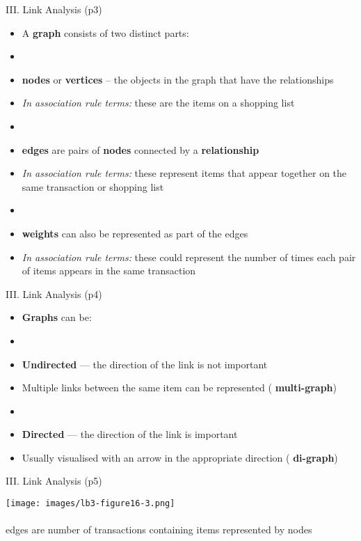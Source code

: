 \documentclass[handout]{beamer}
\newcommand{\strong}[1]{\textbf{\color{teal} #1}}
\newcommand{\stronger}[1]{\textbf{\color{purple} #1}}
\begin{document}
\begin{frame}{III. Link Analysis (p3)}
\begin{itemize}
\item[] A \stronger{graph} consists of two distinct parts:
\item[]
\item \strong{nodes} or \strong{vertices} -- the objects in the graph that have the relationships
\item \emph{In association rule terms:} these are the items on a shopping list
\item[]
\item \strong{edges} are pairs of \strong{nodes} connected by a \strong{relationship}
\item \emph{In association rule terms:} these represent items that appear together on the same transaction or shopping list
\item[]
\item \stronger{weights} can also be represented as part of the edges
\item \emph{In association rule terms:} these could represent the number of times each pair of items appears in the same transaction
\end{itemize}
\end{frame}
\begin{frame}{III. Link Analysis (p4)}
\begin{itemize}
\item[] \stronger{Graphs} can be:
\item[]
\item \stronger{Undirected} --- the direction of the link is not important
\item Multiple links between the same item can be represented (\strong{multi-graph})
\item[]
\item \stronger{Directed} --- the direction of the link is important
\item Usually visualised with an arrow in the appropriate direction (\strong{di-graph})
\end{itemize}
\end{frame}
\begin{frame}{III. Link Analysis (p5)}
\begin{center}
\texttt{[image: images/lb3-figure16-3.png]}\\ 
\cite[Figure 16.3]{LB3:2011}\\
{\footnotesize edges are number of transactions containing items represented by nodes}
\end{center}
\end{frame}
\end{document}
